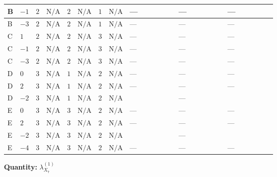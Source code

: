 \documentclass[8pt]{article}
\begin{document}
\begin{landscape}
\begin{longtable}{@{}llcccccc >{\raggedright\arraybackslash}p{0.21\linewidth} >{\raggedright\arraybackslash}p{0.21\linewidth} >{\raggedright\arraybackslash}p{0.21\linewidth}@{}}
\midrule
B & $-1$ & $2$ & $\text{N/A}$ & $2$ & $\text{N/A}$ & $1$ & $\text{N/A}$ & --- & --- & --- \\
\midrule
B & $-3$ & $2$ & $\text{N/A}$ & $2$ & $\text{N/A}$ & $1$ & $\text{N/A}$ & --- & --- & --- \\
\midrule
C & $1$ & $2$ & $\text{N/A}$ & $2$ & $\text{N/A}$ & $3$ & $\text{N/A}$ & --- & --- & --- \\
\midrule
C & $-1$ & $2$ & $\text{N/A}$ & $2$ & $\text{N/A}$ & $3$ & $\text{N/A}$ & --- & --- & --- \\
\midrule
C & $-3$ & $2$ & $\text{N/A}$ & $2$ & $\text{N/A}$ & $3$ & $\text{N/A}$ & --- & --- & --- \\
\midrule
D & $0$ & $3$ & $\text{N/A}$ & $1$ & $\text{N/A}$ & $2$ & $\text{N/A}$ & --- & --- & --- \\
\midrule
D & $2$ & $3$ & $\text{N/A}$ & $1$ & $\text{N/A}$ & $2$ & $\text{N/A}$ & --- & --- & --- \\
\midrule
D & $-2$ & $3$ & $\text{N/A}$ & $1$ & $\text{N/A}$ & $2$ & $\text{N/A}$ & \scriptsize\adjustbox{max width=\linewidth}{$\begin{gathered} +2 {\lambda_{S_2}^{(1)}} {\lambda_{X_{7}}^{(1)}}\end{gathered}$} & --- & \scriptsize\adjustbox{max width=\linewidth}{$\begin{gathered} +4 {\lambda_5} {\lambda_{X_{12}}}\end{gathered}$} \\
\midrule
E & $0$ & $3$ & $\text{N/A}$ & $3$ & $\text{N/A}$ & $2$ & $\text{N/A}$ & --- & --- & --- \\
\midrule
E & $2$ & $3$ & $\text{N/A}$ & $3$ & $\text{N/A}$ & $2$ & $\text{N/A}$ & --- & --- & --- \\
\midrule
E & $-2$ & $3$ & $\text{N/A}$ & $3$ & $\text{N/A}$ & $2$ & $\text{N/A}$ & \scriptsize\adjustbox{max width=\linewidth}{$\begin{gathered} +2 {\lambda_{S_2}^{(1)}} {\lambda_{X_{7}}^{(1)}}\end{gathered}$} & --- & \scriptsize\adjustbox{max width=\linewidth}{$\begin{gathered} +2 {\lambda_5} {\lambda_{X_{12}}}\end{gathered}$} \\
\midrule
E & $-4$ & $3$ & $\text{N/A}$ & $3$ & $\text{N/A}$ & $2$ & $\text{N/A}$ & --- & --- & --- \\
\midrule
\bottomrule
\end{longtable}
\clearpage
\noindent\textbf{Quantity: }${\lambda_{X_{7}}^{(1)}}$\par\smallskip

\end{landscape}
\end{document}
